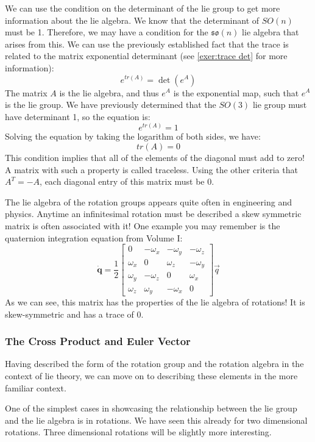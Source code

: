We can use the condition on the determinant of the \gls{lie group} to get more information about the \gls{lie algebra}. We know that the determinant of $SO(n)$ must be 1. Therefore, we may have a condition for the $\mathfrak{so}(n)$ \gls{lie algebra} that arises from this. We can use the previously established fact that the trace is related to the matrix exponential determinant (see \autoref{exer:trace det} for more information):
$$e^{tr(A)}=\det\left(e^A\right)$$
The matrix $A$ is the \gls{lie algebra}, and thus $e^A$ is the exponential map, such that $e^A$ is the \gls{lie group}. We have previously determined that the $SO(3)$ \gls{lie group} must have determinant 1, so the equation is:
$$e^{tr(A)}=1$$
Solving the equation by taking the logarithm of both sides, we have:
$$tr(A)=0$$
This condition implies that all of the elements of the diagonal must add to zero! A matrix with such a property is called traceless. Using the other criteria that $A^T =-A$, each diagonal entry of this matrix must be 0.

The \gls{lie algebra} of the rotation groups appears quite often in engineering and physics. Anytime an infinitesimal rotation must be described a skew symmetric matrix is often associated with it! One example you may remember is the quaternion integration equation from Volume I:
$$\dot{\textbf{q}}=\frac{1}{2}\begin{bmatrix}
        0&-\omega_x&-\omega_y&-\omega_z\\
        \omega_x&0&\omega_z&-\omega_y\\
        \omega_y&-\omega_z&0&\omega_x\\
        \omega_z&\omega_y&-\omega_x&0
    \end{bmatrix}\vec{q}$$
As we can see, this matrix has the properties of the \gls{lie algebra} of rotations! It is skew-symmetric and has a trace of 0.

\subsubsection{The Cross Product and Euler Vector}

Having described the form of the rotation group and the rotation algebra in the context of \gls{lie theory}, we can move on to describing these elements in the more familiar context.

One of the simplest cases in showcasing the relationship between the \gls{lie group} and the \gls{lie algebra} is in rotations. We have seen this already for two dimensional rotations. Three dimensional rotations will be slightly more interesting.

